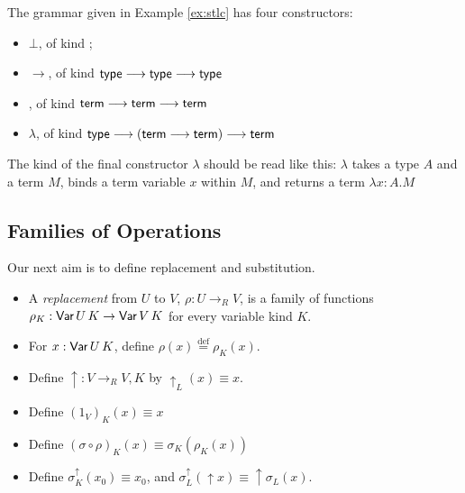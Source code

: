 \documentclass[envcountsame]{llncs}
\newcommand{\eqdef}{\ensuremath{\stackrel{\mathrm{def}}{=}}}
\begin{document}
  
\begin{example}
The grammar given in Example \ref{ex:stlc} has four constructors:
\begin{itemize}
 \item
$\bot$, of kind ;
\item
$\rightarrow$, of kind $\AgdaFunction{type} \longrightarrow \AgdaFunction{type} \longrightarrow \AgdaFunction{type}$
\item
{}, of kind $\AgdaFunction{term} \longrightarrow \AgdaFunction{term} \longrightarrow \AgdaFunction{term}$
\item
$\lambda$, of kind $\AgdaFunction{type} \longrightarrow (\AgdaFunction{term} \longrightarrow \AgdaFunction{term}) \longrightarrow \AgdaFunction{term}$
\end{itemize}
The kind of the final constructor $\lambda$ should be read like this: $\lambda$ takes a type $A$
and a term $M$, binds a term variable $x$ within $M$, and returns a term $\lambda x:A.M$

\end{example}

\subsection{Families of Operations}

Our next aim is to define replacement and substitution.  

\begin{definition}[Replacement]
 \begin{itemize}
  \item A \emph{replacement} from $U$ to $V$, $\rho : U \rightarrow_R V$, is a family of functions $\rho_K : \AgdaDatatype{Var} \, U \, K \rightarrow
  \AgdaDatatype{Var} \, V \, K$ for every variable kind $K$.
  \item For $x : \AgdaDatatype{Var} \, U \, K$, define $\rho(x) \eqdef \rho_K(x)$.
  \item Define $\uparrow : V \rightarrow_R V , K$ by $\uparrow_L(x) \equiv x$.
  \item Define $(1_V)_K(x) \equiv x$
  \item Define $(\sigma \circ \rho)_K (x) \equiv \sigma_K (\rho_K(x))$
  \item Define $\sigma^\uparrow_K(x_0) \equiv x_0$, and $\sigma^\uparrow_L(\uparrow x) \equiv \uparrow \sigma_L(x)$.
\end{itemize}
\end{definition}
\end{document}
